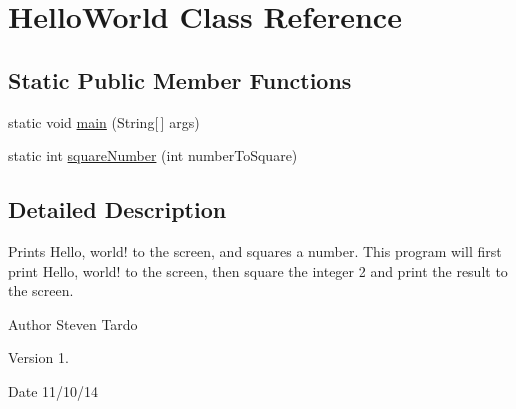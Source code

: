 \hypertarget{class_hello_world}{\section{Hello\+World Class Reference}
\label{class_hello_world}
}
\subsection*{Static Public Member Functions}
\begin{DoxyCompactItemize}
\item 
static void \hyperlink{class_hello_world_a6ee4fcc2452e2a85be43984f46aceba7}{main} (String\mbox{[}$\,$\mbox{]} args)
\item 
static int \hyperlink{class_hello_world_a2c5b33686debfdf1ac01b595769780f4}{square\+Number} (int number\+To\+Square)
\end{DoxyCompactItemize}


\subsection{Detailed Description}
Prints Hello, world! to the screen, and squares a number. This program will first print Hello, world! to the screen, then square the integer 2 and print the result to the screen. \begin{DoxyAuthor}{Author}
Steven Tardo 
\end{DoxyAuthor}
\begin{DoxyVersion}{Version}
1. 
\end{DoxyVersion}
\begin{DoxyDate}{Date}
11/10/14 
\end{DoxyDate}



